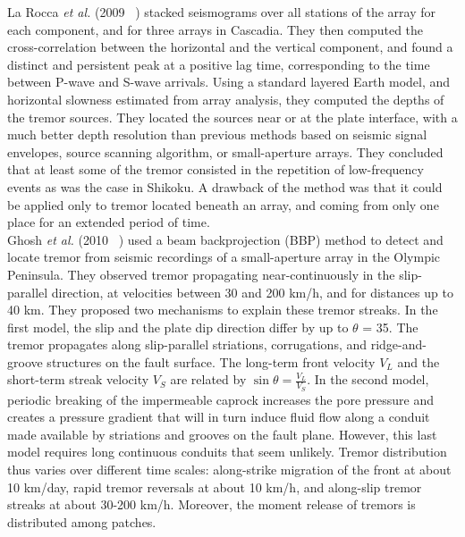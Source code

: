 \documentclass[main.tex]{subfiles}
\begin{document}
La Rocca \textit{et al.} (2009 ~\cite{LAR_2009}) stacked seismograms over all stations of the array for each component, and for three arrays in Cascadia. They then computed the cross-correlation between the horizontal and the vertical component, and found a distinct and persistent peak at a positive lag time, corresponding to the time between P-wave and S-wave arrivals. Using a standard layered Earth model, and horizontal slowness estimated from array analysis, they computed the depths of the tremor sources. They located the sources near or at the plate interface, with a much better depth resolution than previous methods based on seismic signal envelopes, source scanning algorithm, or small-aperture arrays. They concluded that at least some of the tremor consisted in the repetition of low-frequency events as was the case in Shikoku. A drawback of the method was that it could be applied only to tremor located beneath an array, and coming from only one place for an extended period of time. \\

Ghosh \textit{et al.} (2010 ~\cite{GHO_2010_G3}) used a beam backprojection (BBP) method to detect and locate tremor from seismic recordings of a small-aperture array in the Olympic Peninsula. They observed tremor propagating near-continuously in the slip-parallel direction, at velocities between 30 and 200 km/h, and for distances up to 40 km. They proposed two mechanisms to explain these tremor streaks. In the first model, the slip and the plate dip direction differ by up to $\theta$ = 35\degree. The tremor propagates along slip-parallel striations, corrugations, and ridge-and-groove structures on the fault surface. The long-term front velocity $V_L$ and the short-term streak velocity $V_S$ are related by $\sin \theta = \frac{V_L}{V_S}$. In the second model, periodic breaking of the impermeable caprock increases the pore pressure and creates a pressure gradient that will in turn induce fluid flow along a conduit made available by striations and grooves on the fault plane. However, this last model requires long continuous conduits that seem unlikely. Tremor distribution thus varies over different time scales: along-strike migration of the front at about 10 km/day, rapid tremor reversals at about 10 km/h, and along-slip tremor streaks at about 30-200 km/h. Moreover, the moment release of tremors is distributed among patches. \\
\end{document}
